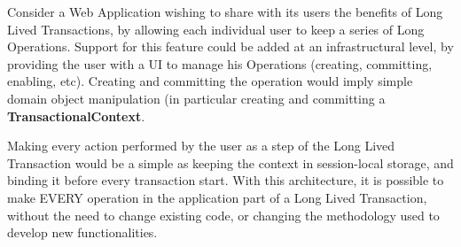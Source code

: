 Consider a Web Application wishing to share with its users the
benefits of Long Lived Transactions, by allowing each individual user
to keep a series of Long Operations. Support for this feature could be
added at an infrastructural level, by providing the user with a UI to
manage his Operations (creating, committing, enabling, etc). Creating
and committing the operation would imply simple domain object
manipulation (in particular creating and committing a {\bf
  TransactionalContext}.

Making every action performed by the user as a step of the Long Lived
Transaction would be a simple as keeping the context in session-local
storage, and binding it before every transaction start. With this
architecture, it is possible to make EVERY operation in the
application part of a Long Lived Transaction, without the need to
change existing code, or changing the methodology used to develop new
functionalities. 
